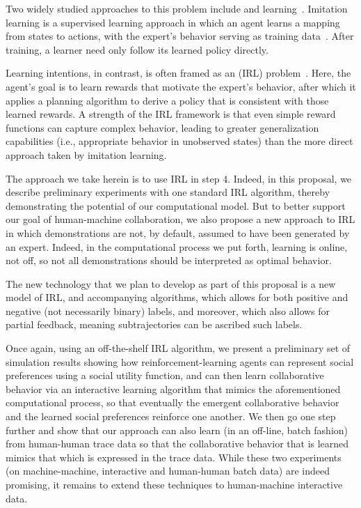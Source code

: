 Two widely studied approaches to this problem include
 and  learning~\cite{macglashan15b}.
Imitation learning is a supervised learning approach in which
an agent learns a mapping from states to actions,
with the expert's behavior serving as training data~\cite{pomerleau93}.
After training, a learner need only follow its learned policy directly.

Learning intentions, in contrast, is often framed as an 
 (IRL) problem~\cite{ng00,babes11}.
Here, the agent's goal is to learn rewards that motivate the expert's
behavior, after which it applies a planning algorithm to derive a
policy that is consistent with those learned rewards.
A strength of the IRL framework is that even simple reward functions
can capture complex behavior, leading to greater generalization
capabilities (i.e., appropriate behavior in unobserved states) than
the more direct approach taken by imitation learning.

The approach we take herein is to use IRL in step 4.  Indeed, in this
proposal, we describe preliminary experiments with one standard IRL
algorithm, thereby demonstrating the potential of our computational model.
%
But to better support our goal of human-machine collaboration, we also
propose a new approach to IRL in which demonstrations are not, by
default, assumed to have been generated by an expert.  Indeed, in the
computational process we put forth, learning is online, not off, so
not all demonstrations should be interpreted as optimal behavior.

The new technology that we plan to develop as part of this proposal is
a new model of IRL, and accompanying algorithms, which allows for both
positive and negative (not necessarily binary) labels, and moreover,
which also allows for partial feedback, meaning subtrajectories can be
ascribed such labels.

Once again, using an off-the-shelf IRL algorithm, we present a
preliminary set of simulation results showing how
reinforcement-learning agents
can represent social preferences using a social utility function, and
can then learn collaborative behavior via an interactive learning
algorithm that mimics the aforementioned computational process, so
that eventually the emergent collaborative behavior and the learned
social preferences reinforce one another.  We then go one step further
and show that our approach can also learn (in an off-line, batch
fashion) from human-human trace data so that the collaborative
behavior that is learned mimics that which is expressed in the trace
data.  While these two experiments (on machine-machine, interactive
and human-human batch data) are indeed promising, it remains to extend
these techniques to human-machine interactive data.

